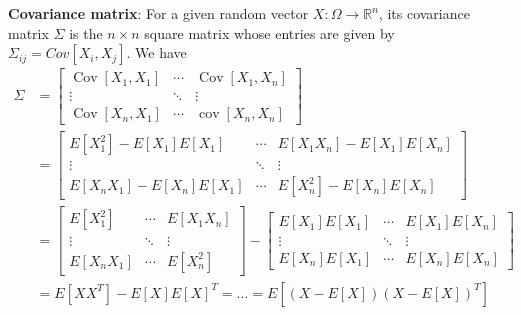 \documentclass[10pt,a4paper,oneside]{beamer}
\begin{document}
\begin{frame}
\vspace{0.3cm}
{\bfseries Covariance matrix}: For a given random vector $X:\Omega\rightarrow\mathbb{R}^n$, its covariance matrix $\Sigma$ is the $n\times n$ square matrix whose entries are given by $\Sigma_{ij}=Cov[X_i,X_j]$. We have
\begin{align*}
\Sigma&=\left[ \begin{array}{ccc}{\operatorname{Cov}\left[X_{1}, X_{1}\right]} & {\cdots} & {\operatorname{Cov}\left[X_{1}, X_{n}\right]} \\ {\vdots} & {\ddots} & {\vdots} \\ {\operatorname{Cov}\left[X_{n}, X_{1}\right]} & {\cdots} & {\operatorname{cov}\left[X_{n}, X_{n}\right]}\end{array}\right] \\&=\left[ \begin{array}{ccc}{E\left[X_{1}^{2}\right]-E\left[X_{1}\right] E\left[X_{1}\right]} & {\cdots} & {E\left[X_{1} X_{n}\right]-E\left[X_{1}\right] E\left[X_{n}\right]} \\ {\vdots} & {\ddots} & {\vdots} \\ {E\left[X_{n} X_{1}\right]-E\left[X_{n}\right] E\left[X_{1}\right]} & {\cdots} & {E\left[X_{n}^{2}\right]-E\left[X_{n}\right] E\left[X_{n}\right]}\end{array}\right] \\&=\left[ \begin{array}{ccc}{E\left[X_{1}^{2}\right]} & {\cdots} & {E\left[X_{1} X_{n}\right]} \\ {\vdots} & {\ddots} & {\vdots} \\ {E\left[X_{n} X_{1}\right]} & {\cdots} & {E\left[X_{n}^{2}\right]}\end{array}\right]-\left[ \begin{array}{ccc}{E\left[X_{1}\right] E\left[X_{1}\right]} & {\cdots} & {E\left[X_{1}\right] E\left[X_{n}\right]} \\ {\vdots} & {\ddots} & {\vdots} \\ {E\left[X_{n}\right] E\left[X_{1}\right]} & {\cdots} & {E\left[X_{n}\right] E\left[X_{n}\right]}\end{array}\right] \\&=E\left[X X^{T}\right]-E[X] E[X]^{T}=\ldots=E\left[(X-E[X])(X-E[X])^{T}\right]
\end{align*}
\end{frame}
\end{document}
